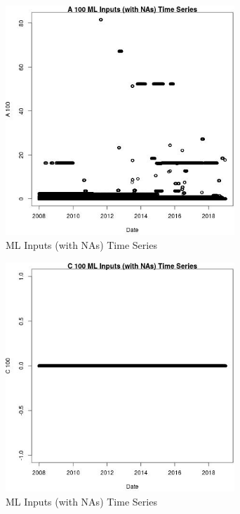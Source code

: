 \begin{figure} 
\centering  
\includegraphics[width=0.77\textwidth]{Code_Outputs/Report_ML_input_PM25_Step4_part_e_de_duplicated_aveswNAs_A_100vDate.jpg} 
\caption{\label{fig:Report_ML_input_PM25_Step4_part_e_de_duplicated_aveswNAsA_100vDate}ML Inputs (with NAs) Time Series} 
\end{figure} 
 

\begin{figure} 
\centering  
\includegraphics[width=0.77\textwidth]{Code_Outputs/Report_ML_input_PM25_Step4_part_e_de_duplicated_aveswNAs_C_100vDate.jpg} 
\caption{\label{fig:Report_ML_input_PM25_Step4_part_e_de_duplicated_aveswNAsC_100vDate}ML Inputs (with NAs) Time Series} 
\end{figure} 
 


